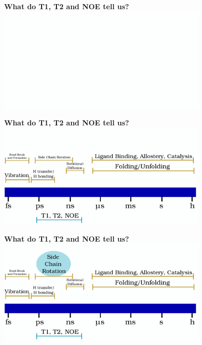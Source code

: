 \documentclass{beamer}
\begin{document}





\begin{frame}
\begin{center}
\Large{\centering
\textbf{What do T1, T2 and NOE tell us?} \\}
\includegraphics[height=5cm]{dynam4.pdf}
\end{center}
\end{frame}


\addtocounter{framenumber}{-1}
\begin{frame}
\begin{center}
\Large{\centering
\textbf{What do T1, T2 and NOE tell us?} \\}
\includegraphics[height=5cm]{dynam0.pdf}
\end{center}
\end{frame}

\addtocounter{framenumber}{-1}
\begin{frame}
\begin{center}
\Large{\centering
\textbf{What do T1, T2 and NOE tell us?} \\}
\includegraphics[height=5cm]{dynam1.pdf}
\end{center}
\end{frame}
\end{document}
